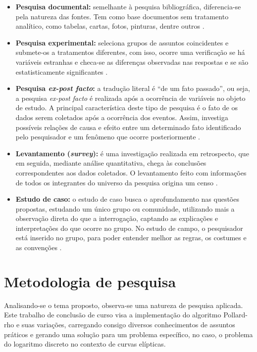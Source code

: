 \begin{itemize}
\begin{itemize}
    \item \textbf{Pesquisa documental:} semelhante à pesquisa bibliográfica, diferencia-se pela natureza das fontes. Tem como base documentos sem tratamento analítico, como tabelas, cartas, fotos, pinturas, dentre outros \cite{Gil:2008}.
    \item \textbf{Pesquisa experimental:} seleciona grupos de assuntos coincidentes e submete-os a tratamentos diferentes, com isso, ocorre uma verificação se há variáveis estranhas e checa-se as diferenças observadas nas respostas e se são estatisticamente significantes \cite{Tafner:2007}.
    \item \textbf{Pesquisa \textit{ex-post facto}:} a tradução literal é ``de um fato passado'', ou seja, a pesquisa \textit{ex-post facto} é realizada após a ocorrência de variáveis no objeto de estudo. A principal característica deste tipo de pesquisa é o fato de os dados serem coletados após a ocorrência dos eventos. Assim, investiga possíveis relações de causa e efeito entre um determinado fato identificado pelo pesquisador e um fenômeno que ocorre posteriormente \cite{Gil:2008}.
    \item \textbf{Levantamento (\textit{survey}):} é uma investigação realizada em retrospecto, que em seguida, mediante análise quantitativa, chega às conclusões correspondentes aos dados coletados. O levantamento feito com informações de todos os integrantes do universo da pesquisa origina um censo \cite{Travassos:2002}.
    \item \textbf{Estudo de caso:} o estudo de caso busca o aprofundamento nas questões propostas, estudando um único grupo ou comunidade, utilizando mais a observação direta do que a interrogação, captando as explicações e interpretações do que ocorre no grupo. No estudo de campo, o pesquisador está inserido no grupo, para poder entender melhor as regras, os costumes e as convenções \cite{Travassos:2002}.
    \end{itemize}
\end{itemize}

%
%
\section{Metodologia de pesquisa}
Analisando-se o tema proposto, observa-se uma natureza de pesquisa aplicada. Este trabalho de conclusão de curso visa a implementação do algoritmo Pollard-rho e suas variações, carregando consigo diversos conhecimentos de assuntos práticos e gerando uma solução para um problema específico, no caso, o problema do logaritmo discreto no contexto de curvas elípticas.


